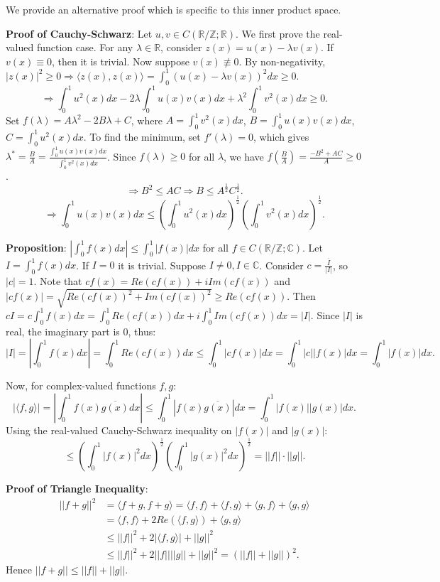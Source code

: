 \documentclass[12pt]{article}
\begin{document}
\begin{pfbox}
    We provide an alternative proof which is specific to this inner product space.
    
    \textbf{Proof of Cauchy-Schwarz}:
    Let $u,v\in C(\mathbb{R}/\mathbb{Z};\mathbb{R})$. We first prove the real-valued function case.
    For any $\lambda\in\mathbb{R}$, consider $z(x)=u(x)-\lambda v(x)$.
    If $v(x)\equiv0$, then it is trivial. 
    Now suppose $v(x)\not\equiv0$.
    By non-negativity, $|z(x)|^{2}\ge0 \Rightarrow \langle z(x),z(x)\rangle=\int_{0}^{1}(u(x)-\lambda v(x))^{2}dx\ge0$.
    $$\Rightarrow \int_{0}^{1}u^{2}(x)dx-2\lambda\int_{0}^{1}u(x)v(x)dx+\lambda^{2}\int_{0}^{1}v^{2}(x)dx\ge0.$$
    Set $f(\lambda)=A\lambda^{2}-2B\lambda+C$, where $A=\int_{0}^{1}v^{2}(x)dx$, $B=\int_{0}^{1}u(x)v(x)dx$, $C=\int_{0}^{1}u^{2}(x)dx$.
    To find the minimum, set $f'(\lambda)=0$, which gives $\lambda^{*}=\frac{B}{A}=\frac{\int_{0}^{1}u(x)v(x)dx}{\int_{0}^{1}v^{2}(x)dx}$.
    Since $f(\lambda)\ge0$ for all $\lambda$, we have $f\left(\frac{B}{A}\right)=\frac{-B^{2}+AC}{A}\ge0$.
    $$\Rightarrow B^{2}\le AC \Rightarrow B\le A^{\frac{1}{2}}C^{\frac{1}{2}}.$$
    $$\Rightarrow \int_{0}^{1}u(x)v(x)dx\le\left(\int_{0}^{1}u^{2}(x)dx\right)^{\frac{1}{2}}\left(\int_{0}^{1}v^{2}(x)dx\right)^{\frac{1}{2}}.$$
    
    \textbf{Proposition}: $\left|\int_{0}^{1}f(x)dx\right|\le\int_{0}^{1}|f(x)|dx$ for all $f\in C(\mathbb{R}/\mathbb{Z};\mathbb{C})$.
    Let $I=\int_{0}^{1}f(x)dx$. If $I=0$ it is trivial. Suppose $I\ne0, I\in\mathbb{C}$.
    Consider $c=\frac{\overline{I}}{|I|}$, so $|c|=1$.
    Note that $cf(x)=Re(cf(x))+i Im(cf(x))$ and $|cf(x)|=\sqrt{Re(cf(x))^{2}+Im(cf(x))^{2}}\ge Re(cf(x))$.
    Then $cI=c\int_{0}^{1}f(x)dx=\int_{0}^{1}Re(cf(x))dx+i\int_{0}^{1}Im(cf(x))dx=|I|$.
    Since $|I|$ is real, the imaginary part is $0$, thus:
    $$|I|=\left|\int_{0}^{1}f(x)dx\right|=\int_{0}^{1}Re(cf(x))dx\le\int_{0}^{1}|cf(x)|dx=\int_{0}^{1}|c||f(x)|dx=\int_{0}^{1}|f(x)|dx.$$
    
    Now, for complex-valued functions $f,g$:
    $$|\langle f,g\rangle|=\left|\int_{0}^{1}f(x)\overline{g(x)}dx\right|\le\int_{0}^{1}\left|f(x)\overline{g(x)}\right|dx=\int_{0}^{1}|f(x)||g(x)|dx.$$
    Using the real-valued Cauchy-Schwarz inequality on $|f(x)|$ and $|g(x)|$:
    $$\le\left(\int_{0}^{1}|f(x)|^{2}dx\right)^{\frac{1}{2}}\left(\int_{0}^{1}|g(x)|^{2}dx\right)^{\frac{1}{2}}=||f||\cdot||g||.$$

    \textbf{Proof of Triangle Inequality}:
    \begin{align*}
        ||f+g||^{2} &= \langle f+g,f+g\rangle = \langle f,f\rangle+\langle f,g\rangle+\langle g,f\rangle+\langle g,g\rangle \\
        &= \langle f,f\rangle+2Re(\langle f,g\rangle)+\langle g,g\rangle \\
        &\le ||f||^{2}+2|\langle f,g\rangle|+||g||^{2} \\
        &\le ||f||^{2}+2||f||||g||+||g||^{2} = (||f||+||g||)^{2}.
    \end{align*}
    Hence $||f+g||\le||f||+||g||$.
\end{pfbox}
\end{document}
